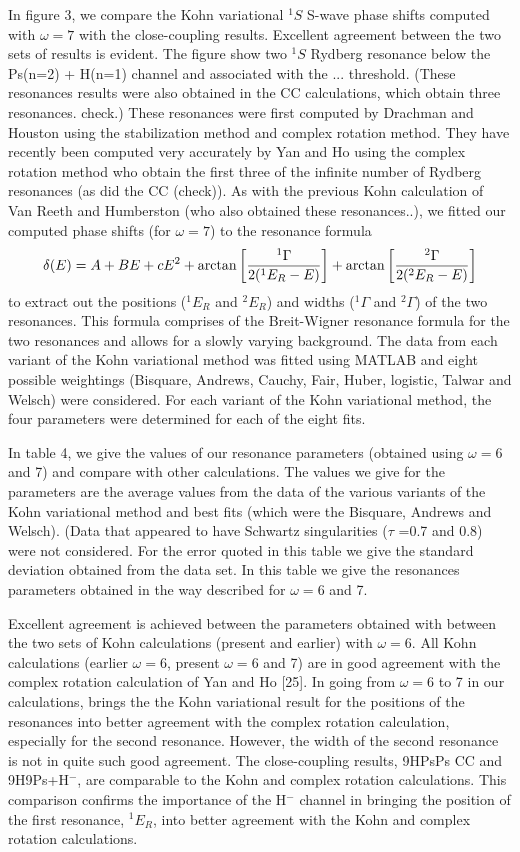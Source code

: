 \documentclass[preprint,showpacs,preprintnumbers,amsmath,amssymb]{revtex4}
\def \bea{\begin{eqnarray}}
\def\eea{\end{eqnarray}}
\begin{document}
In figure 3, we compare the Kohn variational
$^1S$ S-wave phase shifts computed with $\omega =7$
with the close-coupling results.
Excellent agreement between the
two sets of results is evident.
The figure show two $^1S$ Rydberg resonance below the
Ps(n=2) + H(n=1) channel
and associated
with the ... threshold.
(These resonances results were also obtained in the CC calculations,
which obtain three resonances. check.)
These resonances were first computed by
Drachman and Houston using the stabilization
method and complex rotation method.
They have recently been computed very accurately
by Yan and Ho
using the complex rotation method who
obtain the first three of the infinite
number of Rydberg resonances (as did the CC (check)).
As with the previous Kohn calculation of Van Reeth and Humberston (who also
obtained these resonances..),
we fitted our computed phase shifts (for $\omega=7$) to
the resonance formula
\bea
\delta(E) =  A + B E + c E^2
+ \arctan\bigg[ {^1\Gamma\over 2(^1E_R - E)} \bigg]
+ \arctan\bigg[ {^2\Gamma\over 2(^2E_R - E)} \bigg]
\eea
to extract out the positions ($^1E_R$ and $^2E_R$) and widths
($^1\Gamma$ and $^2\Gamma$) of the two resonances.
This formula comprises of the Breit-Wigner resonance
formula for the two resonances and allows for a slowly varying
background.
The data from each variant of
the Kohn variational method was fitted using MATLAB
and eight possible weightings
(Bisquare, Andrews, Cauchy, Fair, Huber, logistic, Talwar and Welsch)
were considered.
For each variant of the Kohn variational
method, the four parameters were determined for each
of the eight fits.

In table 4, we give the values of our resonance
parameters (obtained using $\omega=6$ and 7)
and compare with other calculations.
The values we give for the
parameters are the average values from
the data of the 
 various variants of the
Kohn variational method and  best fits (which were the
Bisquare, Andrews and Welsch).
(Data that appeared to have Schwartz singularities ($\tau$ =0.7 and 0.8)
were not considered.
For the error quoted in this table we give
the standard deviation obtained from the data set.
In this table we give the resonances parameters
obtained in the way described for $\omega=6$ and 7.

Excellent agreement is achieved between the
parameters obtained with between the two sets
of Kohn calculations (present and earlier) with
$\omega =6$.
All Kohn calculations (earlier $\omega=6$, present $\omega=6$ and 7)
are in good agreement with the complex rotation calculation
of Yan and Ho [25].
In going from $\omega=6$ to 7 in our calculations, brings the 
the Kohn variational result for the positions
of the resonances into better agreement with
the complex rotation calculation, especially 
for the second resonance.
However, the width of the second resonance is not
in quite such good agreement.
The close-coupling results, 9HPsPs CC and 9H9Ps+H$^-$,
are comparable to the Kohn and complex rotation calculations.
This comparison confirms the importance of the H$^-$
channel in bringing the position of the first resonance,
$^1E_R$, into better agreement with the Kohn
and complex rotation calculations.
\end{document}
